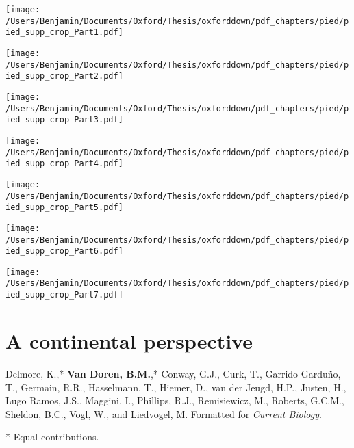 \documentclass[a4paper, nobind]{templates/ociamthesis}
\begin{document}
\begin{center} \texttt{[image: /Users/Benjamin/Documents/Oxford/Thesis/oxforddown/pdf\_chapters/pied/pied\_supp\_crop\_Part1.pdf]} \end{center} \newpage 
 \begin{center} \texttt{[image: /Users/Benjamin/Documents/Oxford/Thesis/oxforddown/pdf\_chapters/pied/pied\_supp\_crop\_Part2.pdf]} \end{center} \newpage 
 \begin{center} \texttt{[image: /Users/Benjamin/Documents/Oxford/Thesis/oxforddown/pdf\_chapters/pied/pied\_supp\_crop\_Part3.pdf]} \end{center} \newpage 
 \begin{center} \texttt{[image: /Users/Benjamin/Documents/Oxford/Thesis/oxforddown/pdf\_chapters/pied/pied\_supp\_crop\_Part4.pdf]} \end{center} \newpage 
 \begin{center} \texttt{[image: /Users/Benjamin/Documents/Oxford/Thesis/oxforddown/pdf\_chapters/pied/pied\_supp\_crop\_Part5.pdf]} \end{center} \newpage 
 \begin{center} \texttt{[image: /Users/Benjamin/Documents/Oxford/Thesis/oxforddown/pdf\_chapters/pied/pied\_supp\_crop\_Part6.pdf]} \end{center} \newpage 
 \begin{center} \texttt{[image: /Users/Benjamin/Documents/Oxford/Thesis/oxforddown/pdf\_chapters/pied/pied\_supp\_crop\_Part7.pdf]} \end{center} \newpage

\part{A continental perspective}

\begin{savequote}
Delmore, K.,* \textbf{Van Doren, B.M.},* Conway, G.J., Curk, T.,
Garrido-Garduño, T., Germain, R.R., Hasselmann, T., Hiemer, D., van der
Jeugd, H.P., Justen, H., Lugo Ramos, J.S., Maggini, I., Phillips, R.J.,
Remisiewicz, M., Roberts, G.C.M., Sheldon, B.C., Vogl, W., and
Liedvogel, M. Formatted for \emph{Current Biology}.

\begin{scriptsize} * Equal contributions. \end{scriptsize}
\end{savequote}
\end{document}

